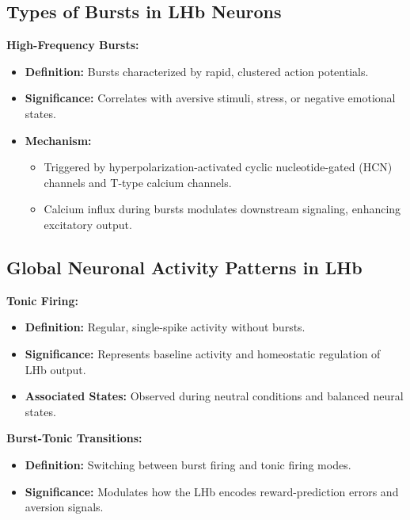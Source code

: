 \documentclass[a4paper,9pt]{extarticle}
\begin{document}
\subsection{Types of Bursts in LHb Neurons}
\textbf{High-Frequency Bursts:}
\begin{itemize}
    \item \textbf{Definition:} Bursts characterized by rapid, clustered action potentials.
    \item \textbf{Significance:} Correlates with aversive stimuli, stress, or negative emotional states.
    \item \textbf{Mechanism:}
    \begin{itemize}
        \item Triggered by hyperpolarization-activated cyclic nucleotide-gated (HCN) channels and T-type calcium channels.
        \item Calcium influx during bursts modulates downstream signaling, enhancing excitatory output.
    \end{itemize}
\end{itemize}

\subsection{Global Neuronal Activity Patterns in LHb}
\textbf{Tonic Firing:}
\begin{itemize}
    \item \textbf{Definition:} Regular, single-spike activity without bursts.
    \item \textbf{Significance:} Represents baseline activity and homeostatic regulation of LHb output.
    \item \textbf{Associated States:} Observed during neutral conditions and balanced neural states.
\end{itemize}

\textbf{Burst-Tonic Transitions:}
\begin{itemize}
    \item \textbf{Definition:} Switching between burst firing and tonic firing modes.
    \item \textbf{Significance:} Modulates how the LHb encodes reward-prediction errors and aversion signals.
\end{itemize}
\end{document}
